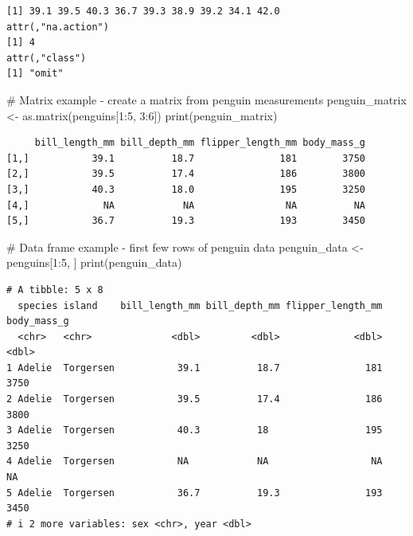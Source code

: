 \documentclass[
  letterpaper,
]{book}
\newenvironment{Shaded}{\begin{snugshade}}{\end{snugshade}}
\newcommand{\CommentTok}[1]{\textcolor[rgb]{0.37,0.37,0.37}{#1}}
\newcommand{\DecValTok}[1]{\textcolor[rgb]{0.68,0.00,0.00}{#1}}
\newcommand{\FunctionTok}[1]{\textcolor[rgb]{0.28,0.35,0.67}{#1}}
\newcommand{\NormalTok}[1]{\textcolor[rgb]{0.00,0.23,0.31}{#1}}
\newcommand{\OtherTok}[1]{\textcolor[rgb]{0.00,0.23,0.31}{#1}}
\newcommand{\SpecialCharTok}[1]{\textcolor[rgb]{0.37,0.37,0.37}{#1}}
\begin{document}
\begin{verbatim}
[1] 39.1 39.5 40.3 36.7 39.3 38.9 39.2 34.1 42.0
attr(,"na.action")
[1] 4
attr(,"class")
[1] "omit"
\end{verbatim}

\begin{Shaded}
\begin{Highlighting}[]
\CommentTok{\# Matrix example {-} create a matrix from penguin measurements}
\NormalTok{penguin\_matrix }\OtherTok{\textless{}{-}} \FunctionTok{as.matrix}\NormalTok{(penguins[}\DecValTok{1}\SpecialCharTok{:}\DecValTok{5}\NormalTok{, }\DecValTok{3}\SpecialCharTok{:}\DecValTok{6}\NormalTok{])}
\FunctionTok{print}\NormalTok{(penguin\_matrix)}
\end{Highlighting}
\end{Shaded}

\begin{verbatim}
     bill_length_mm bill_depth_mm flipper_length_mm body_mass_g
[1,]           39.1          18.7               181        3750
[2,]           39.5          17.4               186        3800
[3,]           40.3          18.0               195        3250
[4,]             NA            NA                NA          NA
[5,]           36.7          19.3               193        3450
\end{verbatim}

\begin{Shaded}
\begin{Highlighting}[]
\CommentTok{\# Data frame example {-} first few rows of penguin data}
\NormalTok{penguin\_data }\OtherTok{\textless{}{-}}\NormalTok{ penguins[}\DecValTok{1}\SpecialCharTok{:}\DecValTok{5}\NormalTok{, ]}
\FunctionTok{print}\NormalTok{(penguin\_data)}
\end{Highlighting}
\end{Shaded}

\begin{verbatim}
# A tibble: 5 x 8
  species island    bill_length_mm bill_depth_mm flipper_length_mm body_mass_g
  <chr>   <chr>              <dbl>         <dbl>             <dbl>       <dbl>
1 Adelie  Torgersen           39.1          18.7               181        3750
2 Adelie  Torgersen           39.5          17.4               186        3800
3 Adelie  Torgersen           40.3          18                 195        3250
4 Adelie  Torgersen           NA            NA                  NA          NA
5 Adelie  Torgersen           36.7          19.3               193        3450
# i 2 more variables: sex <chr>, year <dbl>
\end{verbatim}
\end{document}
